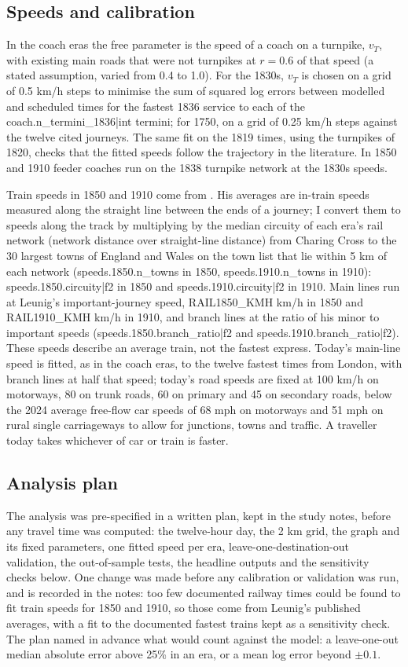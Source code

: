 \subsection{Speeds and calibration}
In the coach eras the free parameter is the speed of a coach on a turnpike, $v_T$, with existing main roads that were not turnpikes at $r = 0.6$ of that speed (a stated assumption, varied from 0.4 to 1.0). For the 1830s, $v_T$ is chosen on a grid of 0.5 km/h steps to minimise the sum of squared log errors between modelled and scheduled times for the fastest 1836 service to each of the {{coach.n_termini_1836|int}} termini; for 1750, on a grid of 0.25 km/h steps against the twelve cited journeys. The same fit on the 1819 times, using the turnpikes of 1820, checks that the fitted speeds follow the trajectory in the literature. In 1850 and 1910 feeder coaches run on the 1838 turnpike network at the 1830s speeds.

Train speeds in 1850 and 1910 come from \citet[Table~2]{leunig2006}. His averages are in-train speeds measured along the straight line between the ends of a journey; I convert them to speeds along the track by multiplying by the median circuity of each era's rail network (network distance over straight-line distance) from Charing Cross to the 30 largest towns of England and Wales on the town list that lie within 5 km of each network ({{speeds.1850.n_towns}} in 1850, {{speeds.1910.n_towns}} in 1910): {{speeds.1850.circuity|f2}} in 1850 and {{speeds.1910.circuity|f2}} in 1910. Main lines run at Leunig's important-journey speed, {{RAIL1850_KMH}} km/h in 1850 and {{RAIL1910_KMH}} km/h in 1910, and branch lines at the ratio of his minor to important speeds ({{speeds.1850.branch_ratio|f2}} and {{speeds.1910.branch_ratio|f2}}). These speeds describe an average train, not the fastest express. Today's main-line speed is fitted, as in the coach eras, to the twelve fastest times from London, with branch lines at half that speed; today's road speeds are fixed at 100 km/h on motorways, 80 on trunk roads, 60 on primary and 45 on secondary roads, below the 2024 average free-flow car speeds of 68 mph on motorways and 51 mph on rural single carriageways \citep{dft2025} to allow for junctions, towns and traffic. A traveller today takes whichever of car or train is faster.

\subsection{Analysis plan}
The analysis was pre-specified in a written plan, kept in the study notes, before any travel time was computed: the twelve-hour day, the 2 km grid, the graph and its fixed parameters, one fitted speed per era, leave-one-destination-out validation, the out-of-sample tests, the headline outputs and the sensitivity checks below. One change was made before any calibration or validation was run, and is recorded in the notes: too few documented railway times could be found to fit train speeds for 1850 and 1910, so those come from Leunig's published averages, with a fit to the documented fastest trains kept as a sensitivity check. The plan named in advance what would count against the model: a leave-one-out median absolute error above 25\% in an era, or a mean log error beyond $\pm0.1$.


